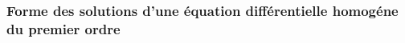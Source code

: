 \documentclass[a4paper, 11pt]{article}
\begin{document}
{\begin{minipage}[t]{0.84\textwidth}
\begin{tabular}{l|l|l|l}


\end{tabular}
\end{minipage}}
\setlength\fboxrule{0.5pt}


%




\subsubsection{Forme des solutions d'une équation différentielle homogéne du premier ordre}
\end{document}

